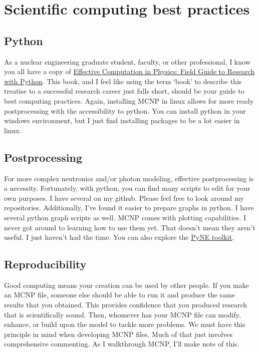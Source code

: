 \documentclass[11pt,a4paper]{article}
\begin{document}
\section{Scientific computing best practices}
\subsection{Python}
\noindent As a nuclear engineering graduate student, faculty, or other professional, I know you all have a copy of \href{https://www.google.com/books/edition/Effective_Computation_in_Physics/6IkNCgAAQBAJ?hl=en&gbpv=0}{Effective Computation in Physics: Field Guide to Research with Python}. This book, and I feel like using the term `book' to describe this treatise to a successful research career just falls short, should be your guide to best computing practices. Again, installing MCNP in linux allows for more ready postprocessing with the accessibility to python. You can install python in your windows environment, but I just find installing packages to be a lot easier in linux. 

\subsection{Postprocessing}
\noindent For more complex neutronics and/or photon modeling, effective postprocessing is a necessity. Fortunately, with python, you can find many scripts to edit for your own purposes. I have several on my github. Please feel free to look around my repositories. Additionally, I've found it easier to prepare graphs in python. I have several python graph scripts as well. MCNP comes with plotting capabilities. I never got around to learning how to use them yet. That doesn't mean they aren't
useful. I just haven't had the time. You can also explore the \href{https://pyne.io/}{PyNE toolkit}.

\subsection{Reproducibility}
\noindent Good computing means your creation can be used by other people. If you make an MCNP file, someone else should be able to run it and produce the same results that you obtained. This provides confidence that you produced research that is scientifically sound. Then, whomever has your MCNP file can modify, enhance, or build upon the model to tackle more problems. We must have this principle in mind when developing MCNP files. Much of that just involves comprehensive commenting. As I walkthrough MCNP, I'll make note of this. 
\end{document}
